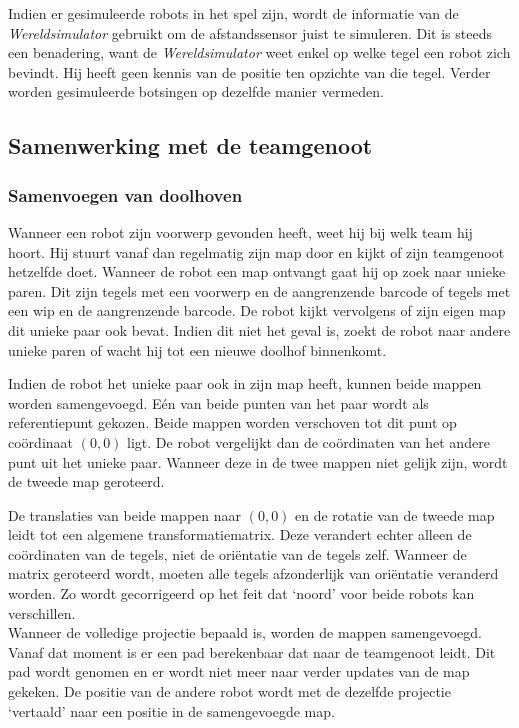 \documentclass[eind]{penoverslag}
\begin{document}
Indien er gesimuleerde robots in het spel zijn, wordt de informatie van de \textit{Wereldsimulator} gebruikt om de afstandssensor juist te simuleren. Dit is steeds een benadering, want de \textit{Wereldsimulator} weet enkel op welke tegel een robot zich bevindt. Hij heeft geen kennis van de positie ten opzichte van die tegel. Verder worden gesimuleerde botsingen op dezelfde manier vermeden.\\

\subsection{Samenwerking met de teamgenoot}
\label{ssec:AlgoSamen}

\subsubsection{Samenvoegen van doolhoven}
\label{sssec:AlgoMappen}
Wanneer een robot zijn voorwerp gevonden heeft, weet hij bij welk team hij hoort. Hij stuurt vanaf dan regelmatig zijn map door en kijkt of zijn teamgenoot hetzelfde doet.
Wanneer de robot een map ontvangt gaat hij op zoek naar unieke paren. Dit zijn tegels met een voorwerp en de aangrenzende barcode of tegels met een wip en de aangrenzende barcode. De robot kijkt vervolgens of zijn eigen map dit unieke paar ook bevat. Indien dit niet het geval is, zoekt de robot naar andere unieke paren of wacht hij tot een nieuwe doolhof binnenkomt.

Indien de robot het unieke paar ook in zijn map heeft, kunnen beide mappen worden samengevoegd. E\'en van beide punten van het paar wordt als referentiepunt gekozen. Beide mappen worden verschoven tot dit punt op co\"ordinaat $(0,0)$ ligt. De robot vergelijkt dan de co\"ordinaten van het andere punt uit het unieke paar. Wanneer deze in de twee mappen niet gelijk zijn, wordt de tweede map geroteerd.

De translaties van beide mappen naar $(0,0)$ en de rotatie van de tweede map leidt tot een algemene transformatiematrix. Deze verandert echter alleen de co\"ordinaten van de tegels, niet de ori\"entatie van de tegels zelf. Wanneer de matrix geroteerd wordt, moeten alle tegels afzonderlijk van ori\"entatie veranderd worden. Zo wordt gecorrigeerd op het feit dat `noord' voor beide robots kan verschillen.\\

Wanneer de volledige projectie bepaald is, worden de mappen samengevoegd. Vanaf dat moment is er een pad berekenbaar dat naar de teamgenoot leidt. Dit pad wordt genomen en er wordt niet meer naar verder updates van de map gekeken. De positie van de andere robot wordt met de dezelfde projectie `vertaald' naar een positie in de samengevoegde map.
\end{document}
